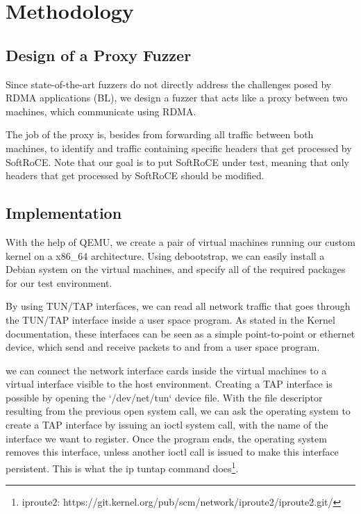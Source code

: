 \section{Methodology}



\subsection{Design of a Proxy Fuzzer}

Since state-of-the-art fuzzers do not directly address the challenges
posed by RDMA applications (BL), we design a fuzzer that acts like a proxy
between two machines, which communicate using RDMA.
%

The job of the proxy is, besides from forwarding all traffic between both machines,
to identify and traffic containing specific headers that get processed by SoftRoCE.
Note that our goal is to put SoftRoCE under test, meaning that only headers that get
processed by SoftRoCE should be modified.
%

\subsection{Implementation} %

With the help of QEMU, we create a pair of virtual machines running
our custom kernel on a x86\_64 architecture. Using debootstrap, we can easily
install a Debian system on the virtual machines, and specify all of
the required packages for our test environment.

By using TUN/TAP interfaces, we can read all network traffic that goes
through the TUN/TAP interface inside a user space program. As stated in
the Kernel documentation, these interfaces can be seen as a simple point-to-point
or ethernet device, which send and receive packets to and from a user space program.

we can connect the network interface cards
inside the virtual machines to a virtual interface visible to the host environment.
%
%
Creating a TAP interface is possible by opening the `/dev/net/tun` device file.
With the file descriptor resulting from the previous open system call, we can ask the operating system
to create a TAP interface by issuing an ioctl system call, with the name of the interface we want to
register. Once the program ends, the operating system removes this interface, unless another ioctl call
is issued to make this interface persistent. This is what the ip tuntap command does\footnote{iproute2: https://git.kernel.org/pub/scm/network/iproute2/iproute2.git/ }.

